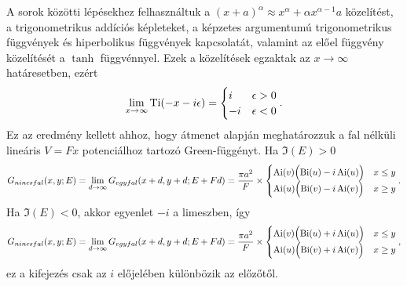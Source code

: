 A sorok közötti lépésekhez felhasználtuk a $(x+a)^\alpha\approx x^\alpha + \alpha x^{\alpha-1}a$ közelítést, a trigonometrikus addíciós képleteket, a képzetes argumentumú trigonometrikus függvények és hiperbolikus függvények kapcsolatát, valamint az előel függvény közelítését a $\tanh$ függvénnyel. Ezek a közelítések egzaktak az $x\to\infty$ határesetben, ezért
\begin{equation}
	\lim_{x\to\infty}\operatorname{Ti}(-x-i\epsilon)=
	\begin{cases}
		i &\epsilon > 0\\
		-i&\epsilon < 0
	\end{cases}.
	\label{limits:ti}
\end{equation}
Ez az eredmény kellett ahhoz, hogy  átmenet alapján meghatározzuk a fal nélküli lineáris $V=Fx$ potenciálhoz tartozó Green-függényt. Ha $\Im(E)>0$
\begin{dmath}
	G_{nincs fal}(x,y;E)=\lim_{d\to\infty}G_{egy fal}(x+d,y+d;E+Fd)=\frac{\pi a^2}{F}\times
	\begin{cases}
		\Ai(v)\Bigl(\Bi(u)-i\Ai(u)\Bigr)&x\leq y\\
		\Ai(u)\Bigl(\Bi(v)-i\Ai(v)\Bigr)&x\geq y
	\end{cases}.
\end{dmath}
Ha $\Im(E)<0$, akkor  egyenlet $-i$ a limeszben, így
\begin{dmath}
	G_{nincs fal}(x,y;E)=\lim_{d\to\infty}G_{egy fal}(x+d,y+d;E+Fd)=\frac{\pi a^2}{F}\times
	\begin{cases}
		\Ai(v)\Bigl(\Bi(u)+i\Ai(u)\Bigr)&x\leq y\\
		\Ai(u)\Bigl(\Bi(v)+i\Ai(v)\Bigr)&x\geq y
	\end{cases},
\end{dmath}
ez a kifejezés csak az $i$ előjelében különbözik az előzőtől.












